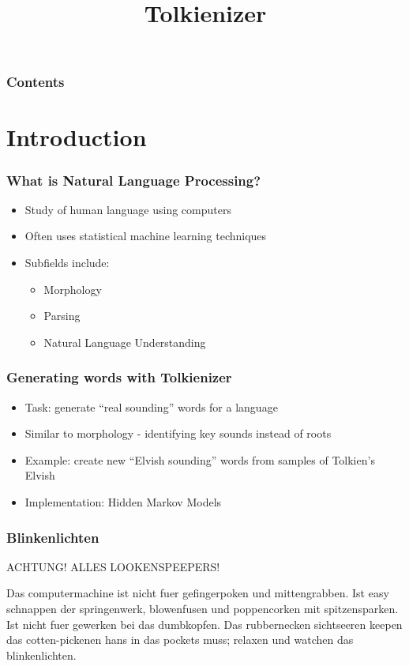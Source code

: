 \documentclass{beamer}
\title[Tolkienizer]{Tolkienizer}
\begin{document}
\begin{frame}
\titlepage
\end{frame}

\begin{frame}
   \frametitle{Contents}
   \tableofcontents[pausesections]
\end{frame}

\section{Introduction}

\begin{frame}
   \frametitle{What is Natural Language Processing?}
   \begin{itemize}
      \item Study of human language using computers
      \item Often uses statistical machine learning techniques
      \item Subfields include:
      \begin{itemize}
         \item Morphology
         \item Parsing
         \item Natural Language Understanding
      \end{itemize}
   \end{itemize}
\end{frame}

\begin{frame}
   \frametitle{Generating words with Tolkienizer}
   \begin{itemize}
      \item Task: generate ``real sounding'' words for a language
      \item Similar to morphology - identifying key sounds instead of roots
      \item Example: create new ``Elvish sounding'' words from samples of Tolkien's Elvish
      \item Implementation: Hidden Markov Models
   \end{itemize}
\end{frame}

\begin{frame}
   \frametitle{Blinkenlichten}
   ACHTUNG! ALLES LOOKENSPEEPERS!

    Das computermachine ist nicht fuer gefingerpoken und
    mittengrabben. Ist easy schnappen der springenwerk, blowenfusen
    und poppencorken mit spitzensparken. Ist nicht fuer gewerken bei
    das dumbkopfen. Das rubbernecken sichtseeren keepen das
    cotten-pickenen hans in das pockets muss; relaxen und watchen das
    blinkenlichten.
\end{frame}
\end{document}
